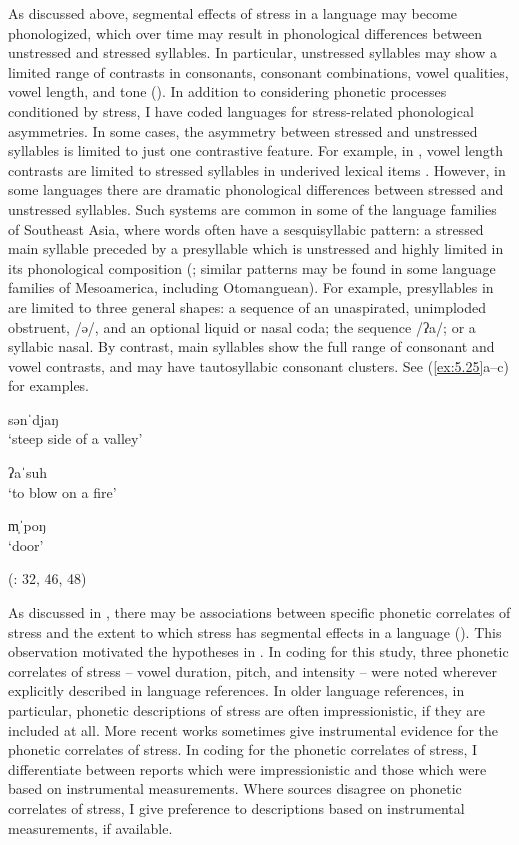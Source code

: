   As discussed above, segmental effects of stress in a language may become phonologized, which over time may result in phonological differences between unstressed and stressed syllables. In particular, unstressed syllables may show a limited range of contrasts in consonants, consonant combinations, vowel qualities, vowel length, and tone (\citealt{vanderHulst2010}). In addition to considering phonetic processes conditioned by stress, I have coded languages for stress-related phonological asymmetries. In some cases, the asymmetry between stressed and unstressed syllables is limited to just one contrastive feature. For example, in , vowel length contrasts are limited to stressed syllables in underived lexical items \citep[1028]{Anderson1997}. However, in some languages there are dramatic phonological differences between stressed and unstressed syllables. Such systems are common in some of the language families of Southeast Asia, where words often have a sesquisyllabic pattern: a stressed main syllable preceded by a presyllable which is unstressed and highly limited in its phonological composition (\citealt{Matisoff1973,Michaud2012}; similar patterns may be found in some language families of Mesoamerica, including Otomanguean). For example, presyllables in  are limited to three general shapes: a sequence of an unaspirated, unimploded obstruent, /ə/, and an optional liquid or nasal coda; the sequence /ʔa/; or a syllabic nasal. By contrast, main syllables show the full range of consonant and vowel contrasts, and may have tautosyllabic consonant clusters. See (\ref{ex:5.25}a--c) for examples.

\ea\label{ex:5.25}

\ea  sənˈdjaŋ\\
\glt ‘steep side of a valley’

\ex  ʔaˈsuh\\
\glt ‘to blow on a fire’

\ex  m̩ˈpoŋ\\
\glt ‘door’

(\citealt{Olsen2014}: 32, 46, 48)
\z
\z

  As discussed in , there may be associations between specific phonetic correlates of stress and the extent to which stress has segmental effects in a language (\citealt{BybeeEtAl1998,Schiering2007}). This observation motivated the hypotheses in . In coding for this study, three phonetic correlates of stress -- vowel duration, pitch, and intensity -- were noted wherever explicitly described in language references. In older language references, in particular, phonetic descriptions of stress are often impressionistic, if they are included at all. More recent works sometimes give instrumental evidence for the phonetic correlates of stress. In coding for the phonetic correlates of stress, I differentiate between reports which were impressionistic and those which were based on instrumental measurements. Where sources disagree on phonetic correlates of stress, I give preference to descriptions based on instrumental measurements, if available.

